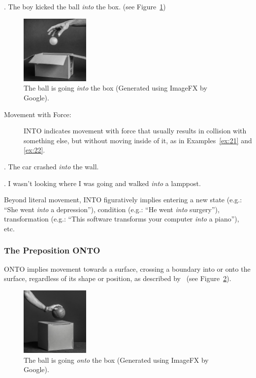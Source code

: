 {{    \ex. The boy kicked the ball \emph{into} the box. (see Figure~\ref{fig: into}) \label{ex:20}

    \begin{figure}[ht]
    \centering
    \includegraphics[width=0.3\textwidth]{textual/Figuras/image_fx_hand_throwing_a_ball_into_an_open_cardboard_b.jpg}
    \caption{The ball is going \emph{into} the box (Generated using ImageFX by Google).}
    \label{fig: into}
    \end{figure}
    
\begin{description}   
    \item [Movement with Force:] INTO indicates movement with force that usually results in collision with something else, but without moving inside of it, as in  Examples~\ref{ex:21} and \ref{ex:22}.
\end{description}
    
    \ex. The car crashed \emph{into} the wall. \label{ex:21}
    
    \ex. I wasn't looking where I was going and walked \emph{into} a lamppost. \label{ex:22}         


Beyond literal movement, INTO figuratively implies entering a new state (e.g.: ``She went \emph{into} a depression''), condition (e.g.: ``He went \emph{into} surgery''), transformation (e.g.: ``This software transforms your computer \emph{into} a piano''), etc. 


\subsubsection{The Preposition ONTO}
ONTO implies movement towards a surface, crossing a boundary into or onto the surface, regardless of its shape or position, as described by~\textcite{bruckfield2011prepositions} (see Figure~\ref{fig: onto}). 

    \begin{figure}[ht]
    \centering
    \includegraphics[width=0.3\textwidth]{textual/Figuras/image_fx_placing_a_ball_onto_a_closed_cardborad_box_bl.jpg}
    \caption{The ball is going \emph{onto} the box (Generated using ImageFX by Google).}
    \label{fig: onto}
    \end{figure}

}}
